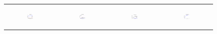 ~\newpage\begin{figure}[ht]
  \centering
  \begin{tabular}{cccc}
	  \begin{subfigure}[h]{0.22\textwidth}
	  	\includegraphics[width=110pt]{images/runtime_ring_setcover.eps}
			\caption{}
			\label{appfig:runtime_ring_setcover}
	  \end{subfigure} &
	  \begin{subfigure}[h]{0.22\textwidth}
	  	\includegraphics[width=110pt]{images/speedup_ring_setcover.eps}
			\caption{}
			\label{appfig:speedup_ring_setcover}
	  \end{subfigure} &
	  \begin{subfigure}[h]{0.22\textwidth}
	  	\includegraphics[width=110pt]{images/diffFA_CF2G_ring_setcover.eps}
			\caption{}
			\label{appfig:diffFA_CF2G_ring_setcover}
	  \end{subfigure} &
	  \begin{subfigure}[h]{0.22\textwidth}
	  	\includegraphics[width=110pt]{images/validated_CC2G_ring_setcover.eps}
			\caption{}
			\label{appfig:validated_CC2G_ring_setcover}
	  \end{subfigure} \\

\end{tabular}
\end{figure}

